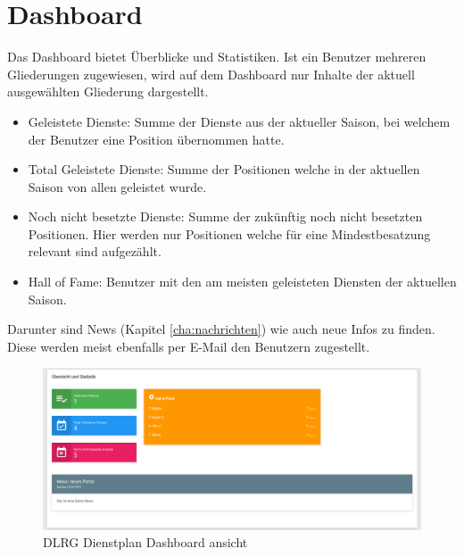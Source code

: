 \chapter{Dashboard}
\label{cha:dashboard}

Das Dashboard bietet Überblicke und Statistiken. Ist ein Benutzer mehreren Gliederungen zugewiesen, wird auf dem Dashboard nur Inhalte der aktuell ausgewählten Gliederung dargestellt.

\begin{itemize}
\item Geleistete Dienste: Summe der Dienste aus der aktueller Saison, bei welchem der Benutzer eine Position übernommen hatte.
\item Total Geleistete Dienste: Summe der Positionen welche in der aktuellen Saison von allen geleistet wurde.
\item Noch nicht besetzte Dienste: Summe der zukünftig noch nicht besetzten Positionen. Hier werden nur Positionen welche für eine Mindestbesatzung relevant sind aufgezählt.
\item Hall of Fame: Benutzer mit den am meisten geleisteten Diensten der aktuellen Saison. 
\end{itemize}

\noindent Darunter sind News (Kapitel \ref{cha:nachrichten}) wie auch neue Infos zu finden. Diese werden meist ebenfalls per E-Mail den Benutzern zugestellt.

\begin{figure}[h]
 \begin{addmargin}{-0.2\linewidth}
   \centering 
   \includegraphics[width=20cm]{Bilder/view_overview.png}
 \end{addmargin} 
 \caption[Dashboard ansicht]{DLRG Dienstplan Dashboard ansicht}
 \label{fig:view_overview}
\end{figure}